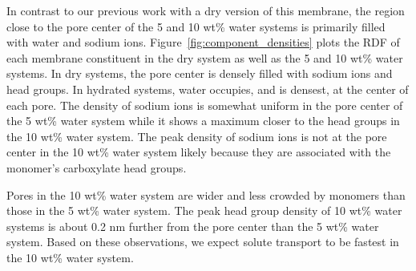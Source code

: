 \documentclass[journal=jpcbfk,manuscript=article]{achemso}
\begin{document}
  In contrast to our previous work with a dry version of this membrane, the 
  region close to the pore center of the 5 and 10 wt\% water systems is 
  primarily filled with water and sodium ions. Figure~\ref{fig:component_densities}
  plots the RDF of each membrane constituent in the dry system as well as the
  5 and 10 wt\% water systems. In dry systems, the pore center is densely 
  filled with sodium ions and head groups. In hydrated systems, water occupies, 
  and is densest, at the center of each pore. The density of sodium ions is 
  somewhat uniform in the pore center of the 5 wt\% water system while it shows
  a maximum closer to the head groups in the 10 wt\% water system. The peak 
  density of sodium ions is not at the pore center in the 10 wt\% water system
  likely because they are associated with the monomer's carboxylate head groups.
  
  Pores in the 10 wt\% water system are wider and less crowded by monomers than
  those in the 5 wt\% water system. The peak head group density of 10 wt\% water
  systems is about 0.2 nm further from the pore center than the 5 wt\% water system. 
  Based on these observations, we expect solute transport to be fastest in the 
  10 wt\% water system.
  
\end{document}
